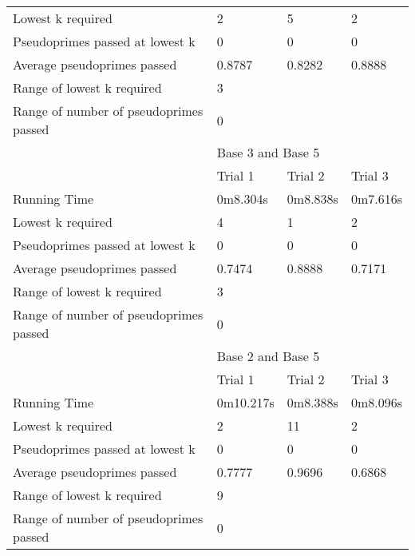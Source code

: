\documentclass{article}
\begin{document}
\begin{appendices}
\begin{longtable}{llll}
Lowest k required                      & 2         & 5        & 2               \\
Pseudoprimes passed at lowest k        & 0         & 0        & 0               \\
Average pseudoprimes passed            & 0.8787    & 0.8282   & 0.8888          \\
\cmidrule(lr){2-4}
Range of lowest k required             & \multicolumn{3}{l}{3}                  \\
Range of number of pseudoprimes passed & \multicolumn{3}{l}{0}                  \\
\midrule
                                       & \multicolumn{3}{l}{Base 3 and Base 5}  \\
\midrule
                                       & Trial 1   & Trial 2  & Trial 3         \\
Running Time                           & 0m8.304s  & 0m8.838s & 0m7.616s        \\
Lowest k required                      & 4         & 1        & 2               \\
Pseudoprimes passed at lowest k        & 0         & 0        & 0               \\
Average pseudoprimes passed            & 0.7474    & 0.8888   & 0.7171          \\
\cmidrule(lr){2-4}
Range of lowest k required             & \multicolumn{3}{l}{3}                  \\
Range of number of pseudoprimes passed & \multicolumn{3}{l}{0}                  \\
\midrule
                                       & \multicolumn{3}{l}{Base 2 and Base 5}  \\
\midrule
                                       & Trial 1   & Trial 2  & Trial 3         \\
Running Time                           & 0m10.217s & 0m8.388s & 0m8.096s        \\
Lowest k required                      & 2         & 11       & 2               \\
Pseudoprimes passed at lowest k        & 0         & 0        & 0               \\
Average pseudoprimes passed            & 0.7777    & 0.9696   & 0.6868          \\
\cmidrule(lr){2-4}
Range of lowest k required             & \multicolumn{3}{l}{9}                  \\
Range of number of pseudoprimes passed & \multicolumn{3}{l}{0}                  \\
\bottomrule
\end{longtable}
\FloatBarrier


\end{appendices}
\end{document}
